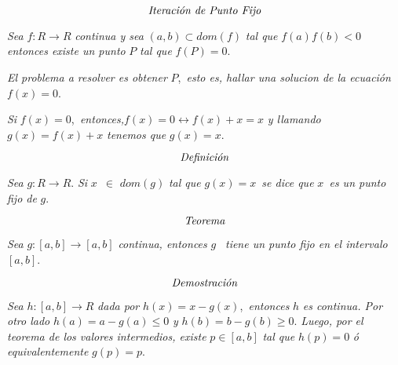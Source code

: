 \documentclass{article}
\begin{document}
\begin{equation*}
\text{\emph{Iteraci\'{o}n de Punto Fijo}}
\end{equation*}

\textit{Sea }$f:R\rightarrow R$ \textit{continua y sea }$\left( a,b\right)
\subset dom(f)$ \textit{tal que} $f(a)f(b)<0$ $\mathit{\ }$\textit{entonces
existe un punto }$P$ \textit{tal que }$f(P)=0$.

\textit{El problema a resolver es obtener }$P$,\textit{\ esto es, hallar una
solucion de la ecuaci\'{o}n }$f(x)=0$.

\textit{Si }$f(x)=0$,\textit{\ entonces,}$f(x)=0\leftrightarrow f(x)+x=x$ 
\textit{y llamando }$g(x)=f(x)+x$ \textit{tenemos que }$g(x)=x.$

\begin{equation*}
\text{\emph{Definici\'{o}n}} 
\end{equation*}

\bigskip \textit{Sea }$g:R\rightarrow R$. \textit{Si }$x$\textit{\ }$\in $ $%
dom(g)$ \textit{tal que }$g(x)=x$\textit{\ se dice que }$x$\textit{\ es un
punto fijo de }$g.$

\begin{equation*}
\text{\emph{Teorema}} 
\end{equation*}

\textit{Sea }$g:\left[ a,b\right] \rightarrow \left[ a,b\right] $  \textit{continua, entonces} $g$%
\textit{\ tiene un punto fijo en el intervalo }$\left[ a,b\right] $.

\begin{equation*}
\text{\emph{Demostraci\'{o}n}} 
\end{equation*}

\textit{Sea }$h:\left[ a,b\right] \rightarrow R$ \textit{dada por }$%
h(x)=x-g(x)$,\textit{\ entonces }$h$ \textit{es continua. Por otro lado }$%
h(a)=a-g(a)\leq 0$ \textit{y }$h(b)=b-g(b)\geq 0$. \textit{Luego, por el
teorema de los valores intermedios, existe }$p\in \left[ a,b\right] $ 
\textit{tal que }$h(p)=0$ \textit{\'{o} equivalentemente }$g(p)=p$.
\end{document}
